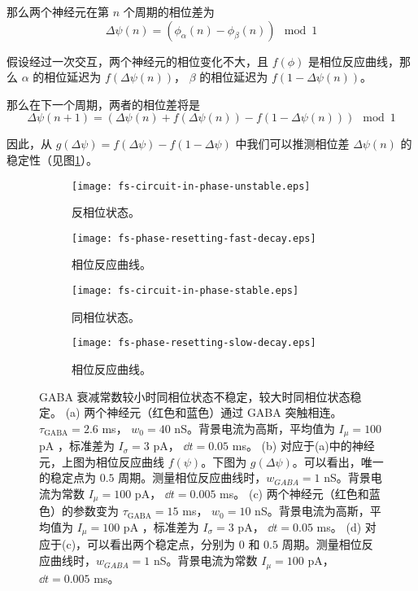 那么两个神经元在第 $n$ 个周期的相位差为
\begin{equation}
\Delta\psi\left(n\right) = \left(\phi_{\alpha}\left(n\right) - \phi_{\beta}\left(n\right)\right) \mod 1
\end{equation}

假设经过一次交互，两个神经元的相位变化不大，且 $f\left(\phi\right)$ 是相位反应曲线，那么 $\alpha$ 的相位延迟为 $f(\Delta\psi\left(n\right))$， $\beta$ 的相位延迟为 $f(1-\Delta\psi\left(n\right))$。

那么在下一个周期，两者的相位差将是
\begin{equation}
\Delta\psi\left(n+1\right) = \left( \Delta\psi\left(n\right) + f(\Delta\psi\left(n\right)) - f(1-\Delta\psi\left(n\right)) \right) \mod 1
\end{equation}

因此，从 $g\left(\Delta\psi\right) = f(\Delta\psi) - f(1-\Delta\psi)$ 中我们可以推测相位差 $\Delta\psi\left(n\right)$ 的稳定性（见图\ref{figure:circuit-anti-phase-in-phase}）。

\begin{figure}
    \begin{subfigure}{0.5\textwidth}
        \texttt{[image: fs-circuit-in-phase-unstable.eps]}
        \caption{反相位状态。}
    \end{subfigure}
    \begin{subfigure}{0.5\textwidth}
        \texttt{[image: fs-phase-resetting-fast-decay.eps]}
        \caption{相位反应曲线。}
    \end{subfigure}
    \begin{subfigure}{0.5\textwidth}
        \texttt{[image: fs-circuit-in-phase-stable.eps]}
        \caption{同相位状态。}
    \end{subfigure}
    \begin{subfigure}{0.5\textwidth}
        \texttt{[image: fs-phase-resetting-slow-decay.eps]}
        \caption{相位反应曲线。}
    \end{subfigure}
\caption{GABA 衰减常数较小时同相位状态不稳定，较大时同相位状态稳定。
(a) 两个神经元（红色和蓝色）通过 GABA 突触相连。$\tau_\text{GABA} = 2.6$ ms， $w_0 = 40$ nS。背景电流为高斯，平均值为 $I_{\mu} = 100$ pA ，标准差为 $I_{\sigma} = 3$ pA， $\dd{t} = 0.05$ ms。
(b) 对应于(a)中的神经元，上图为相位反应曲线 $f\left(\psi\right)$。下图为 $g\left(\Delta\psi\right)$。可以看出，唯一的稳定点为 $0.5$ 周期。测量相位反应曲线时，$w_{GABA} = 1$ nS。背景电流为常数 $I_{\mu} = 100$ pA， $\dd{t} = 0.005$ ms。
(c) 两个神经元（红色和蓝色）的参数变为 $\tau_\text{GABA} = 15$ ms， $w_0 = 10$ nS。背景电流为高斯，平均值为 $I_{\mu} = 100$ pA ，标准差为 $I_{\sigma} = 3$ pA， $\dd{t} = 0.05$ ms。
(d) 对应于(c)，可以看出两个稳定点，分别为 $0$ 和 $0.5$ 周期。测量相位反应曲线时，$w_{GABA} = 1$ nS。背景电流为常数 $I_{\mu} = 100$ pA， $\dd{t} = 0.005$ ms。}
\label{figure:circuit-anti-phase-in-phase}
\end{figure}

